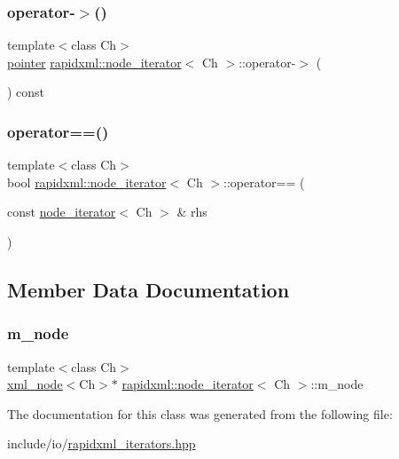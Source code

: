 \subsubsection{\texorpdfstring{operator-\/$>$()}{operator->()}}
{\footnotesize\ttfamily template$<$class Ch$>$ \\
\mbox{\hyperlink{classrapidxml_1_1node__iterator_a65dca8bca2b9c29f635b9ad0bdeeecb9}{pointer}} \mbox{\hyperlink{classrapidxml_1_1node__iterator}{rapidxml\+::node\+\_\+iterator}}$<$ Ch $>$\+::operator-\/$>$ (\begin{DoxyParamCaption}{ }\end{DoxyParamCaption}) const\hspace{0.3cm}{\ttfamily [inline]}}

\mbox{\label{classrapidxml_1_1node__iterator_a5cb8a3b0d65a1a2517995e986a4debfd}} 
\subsubsection{\texorpdfstring{operator==()}{operator==()}}
{\footnotesize\ttfamily template$<$class Ch$>$ \\
bool \mbox{\hyperlink{classrapidxml_1_1node__iterator}{rapidxml\+::node\+\_\+iterator}}$<$ Ch $>$\+::operator== (\begin{DoxyParamCaption}\item[{const \mbox{\hyperlink{classrapidxml_1_1node__iterator}{node\+\_\+iterator}}$<$ Ch $>$ \&}]{rhs }\end{DoxyParamCaption})\hspace{0.3cm}{\ttfamily [inline]}}



\subsection{Member Data Documentation}
\mbox{\label{classrapidxml_1_1node__iterator_adeb3cd87d8ea08aa56d14166146fa291}} 
\subsubsection{\texorpdfstring{m\_node}{m\_node}}
{\footnotesize\ttfamily template$<$class Ch$>$ \\
\mbox{\hyperlink{classrapidxml_1_1xml__node}{xml\+\_\+node}}$<$Ch$>$$\ast$ \mbox{\hyperlink{classrapidxml_1_1node__iterator}{rapidxml\+::node\+\_\+iterator}}$<$ Ch $>$\+::m\+\_\+node\hspace{0.3cm}{\ttfamily [private]}}



The documentation for this class was generated from the following file\+:\begin{DoxyCompactItemize}
\item 
include/io/\mbox{\hyperlink{rapidxml__iterators_8hpp}{rapidxml\+\_\+iterators.\+hpp}}\end{DoxyCompactItemize}
